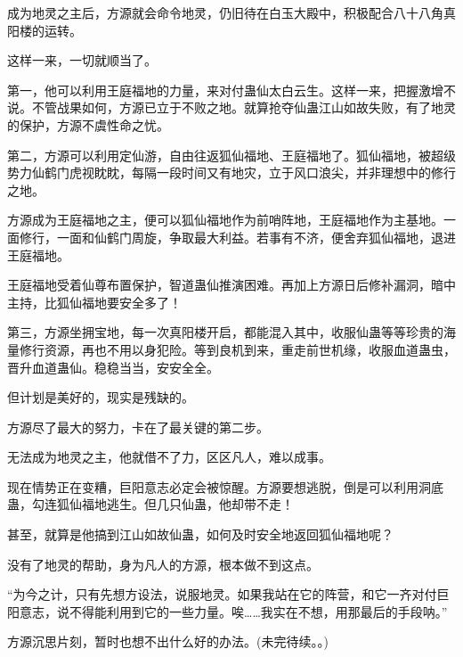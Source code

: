 \begin{this_body}
成为地灵之主后，方源就会命令地灵，仍旧待在白玉大殿中，积极配合八十八角真阳楼的运转。

这样一来，一切就顺当了。

第一，他可以利用王庭福地的力量，来对付蛊仙太白云生。这样一来，把握激增不说。不管战果如何，方源已立于不败之地。就算抢夺仙蛊江山如故失败，有了地灵的保护，方源不虞性命之忧。

第二，方源可以利用定仙游，自由往返狐仙福地、王庭福地了。狐仙福地，被超级势力仙鹤门虎视眈眈，每隔一段时间又有地灾，立于风口浪尖，并非理想中的修行之地。

方源成为王庭福地之主，便可以狐仙福地作为前哨阵地，王庭福地作为主基地。一面修行，一面和仙鹤门周旋，争取最大利益。若事有不济，便舍弃狐仙福地，退进王庭福地。

王庭福地受着仙尊布置保护，智道蛊仙推演困难。再加上方源日后修补漏洞，暗中主持，比狐仙福地要安全多了！

第三，方源坐拥宝地，每一次真阳楼开启，都能混入其中，收服仙蛊等等珍贵的海量修行资源，再也不用以身犯险。等到良机到来，重走前世机缘，收服血道蛊虫，晋升血道蛊仙。稳稳当当，安安全全。

但计划是美好的，现实是残缺的。

方源尽了最大的努力，卡在了最关键的第二步。

无法成为地灵之主，他就借不了力，区区凡人，难以成事。

现在情势正在变糟，巨阳意志必定会被惊醒。方源要想逃脱，倒是可以利用洞底蛊，勾连狐仙福地逃生。但几只仙蛊，他却带不走！

甚至，就算是他搞到江山如故仙蛊，如何及时安全地返回狐仙福地呢？

没有了地灵的帮助，身为凡人的方源，根本做不到这点。

“为今之计，只有先想方设法，说服地灵。如果我站在它的阵营，和它一齐对付巨阳意志，说不得能利用到它的一些力量。唉……我实在不想，用那最后的手段呐。”

方源沉思片刻，暂时也想不出什么好的办法。(未完待续。。)

\end{this_body}

